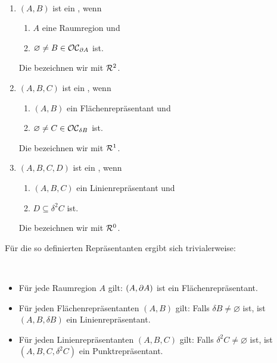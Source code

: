     \begin{dfn}[Repräsentanten]\label{dfn:repr}\ \vspace{0pt}

        \begin{enumerate}
            \item $(A,B)$ ist ein , wenn 
                \begin{enumerate}
                    \item $A$ eine Raumregion und
                    \item $\varnothing \neq B \in \mathcal{OC}_{\partial A}$ ist.
                \end{enumerate}
                Die  bezeichnen wir mit $\mathcal{R}^2$.
            \item $(A,B,C)$ ist ein , wenn 
                \begin{enumerate}
                    \item $(A,B)$ ein Flächenrepräsentant und
                    \item $\varnothing \neq C \in \mathcal{OC}_{\delta B}$ ist.
                \end{enumerate}
                Die  bezeichnen wir mit $\mathcal{R}^1$.
            \item $(A,B,C,D)$ ist ein , wenn 
                \begin{enumerate}
                    \item $(A,B,C)$ ein Linienrepräsentant und
                    \item $D \subseteq \delta^2 C$ ist.
                \end{enumerate}
                Die  bezeichnen wir mit $\mathcal{R}^0$.
        \end{enumerate}
    \end{dfn}
    
    Für die so definierten Repräsentanten ergibt sich trivialerweise:
    
    \begin{satz}\ \vspace{0pt}
    
        \begin{itemize}
            \item Für jede Raumregion $A$ gilt: $(A, \partial A)$ ist ein Flächenrepräsentant.
            \item Für jeden Flächenrepräsentanten $(A,B)$ gilt: 
                Falls $\delta B \neq \varnothing$ ist, ist $(A, B, \delta B)$ ein Linienrepräsentant.
            \item Für jeden Linienrepräsentanten $(A,B,C)$ gilt: 
                Falls $\delta^2 C \neq \varnothing$ ist, ist $(A, B, C, \delta^2 C)$ ein Punktrepräsentant.
        \end{itemize}
        
    \end{satz}
    
